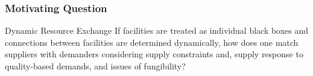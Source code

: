 
\begin{frame}[ctb!]
  \frametitle{\Cyclus}
  
\end{frame}

\begin{frame}[ctb!]
  \frametitle{Motivating Question}
  
  \begin{block}{Dynamic Resource Exchange}
    If facilities are treated as individual black boxes and connections between
    facilities are determined dynamically, how does one match suppliers with
    demanders considering supply constraints and, supply response to
    quality-based demands, and issues of fungibility?
  \end{block}

\end{frame}
